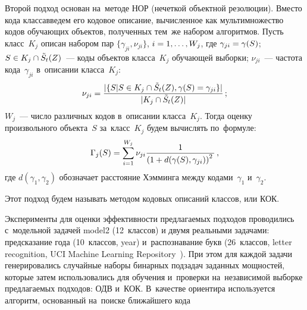 \begin{multicols}{2}
Второй подход основан на~методе НОР (нечеткой объектной резолюции).
Вместо кода класса\linebreak введем его кодовое описание, вычисленное как 
мультимножество кодов обучающих объектов, полученных тем~же набором алгоритмов.
Пусть класс~$K_j$ описан набором пар $\{\gamma_{ji}, \nu_{ji}\}$, $i\hm=1,\ldots,W_j$,
 где $\gamma_{ji}\hm=\gamma(S)$; $S\hm\in K_j\cap \tilde{S}_t(Z)$~--- коды 
 объектов класса~$K_j$ обучающей выборки;
 $\nu_{ji}$~--- час\-то\-та кода~$\gamma_{ji}$ в~описании класса~$K_j$: 
 $$
 \nu_{ji}=\fr{{|\{S|S\hm\in K_j\cap \tilde{S}_t(Z),
 \gamma(S)=\gamma_{ji}\}|}}{{|K_j\cap \tilde{S}_t(Z)|}}\,;
 $$
 $W_j$~--- число различных кодов в~описании класса~$K_j$.
Тогда оценку произвольного объекта~$S$ за~класс~$K_j$ будем вычислять по~формуле:
$$
\Gamma_j(S) = \sum\limits_{i=1}^{W_j}\nu_{ji}\displaystyle\frac{\displaystyle 1\mathstrut}{\displaystyle \left(1+d(\gamma(S),\gamma_{ji})\right)^2\mathstrut}\,,
$$
где $d(\gamma_1, \gamma_2)$ обозначает расстояние Хэмминга между 
кодами~$\gamma_1$ и~$\gamma_2$.



Этот подход будем называть методом кодовых описаний классов, или КОК.

Эксперименты для оценки эффективности предлагаемых подходов проводились
  с~модельной задачей model2 (12~классов) и двумя реальными задачами:
  предсказание года (10~классов, year)
  и~распознавание букв (26~классов, letter recognition, UCI Machine Learning 
  Repository~\cite{uci}).
При этом для каждой задачи генерировались случайные наборы бинарных подзадач 
заданных мощностей, которые затем использовались для обучения 
и~проверки на~независимой выборке предлагаемых подходов: ОДВ и~КОК.
В~качестве ориентира используется алгоритм, основанный на~поиске ближайшего
 кода\linebreak\vspace*{-12pt}
 
 \pagebreak
 

\end{multicols}
